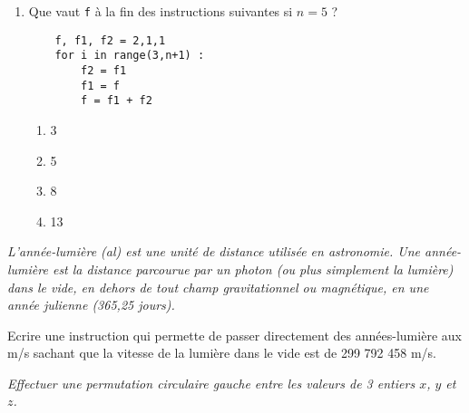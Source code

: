 \begin{td}[QCM (2)]
\begin{enumerate}
	\begin{py}{4cm}
	\begin{verbatim}
	f = 1
	for i in range(2,n+1) :
	    f = f * i
	\end{verbatim}
	\end{py}

	\begin{enumerate}
	\item 120
	\item 720
	\item 6
	\item 24
	\end{enumerate}
\item Que vaut {\tt f} à la fin des instructions suivantes si $n = 5$ ?

	\begin{py}{4cm}
	\begin{verbatim}
	f, f1, f2 = 2,1,1
	for i in range(3,n+1) :
	    f2 = f1
	    f1 = f
	    f = f1 + f2
	\end{verbatim}
	\end{py}

	\begin{enumerate}
	\item 3
	\item 5
	\item 8
	\item 13
	\end{enumerate}
\end{enumerate}
\end{td}


\begin{td}\label{td:al}\em {}
L'année-lumière (al) est une unité de distance utilisée en astronomie. 
Une année-lumière est la distance parcourue par un photon (ou plus simplement la lumière) 
dans le vide, en dehors de tout champ gravitationnel ou magnétique, en une année julienne 
(365,25 jours). 

Ecrire une instruction qui permette de passer directement des années-lumière aux m/s sachant que
la vitesse de la lumière dans le vide est de 299 792 458 m/s.
\end{td}

\begin{td}\label{td:permutation2}\em {}
 Effectuer une permutation circulaire gauche entre les valeurs de 3 entiers $x$, $y$ et $z$.
\end{td}

